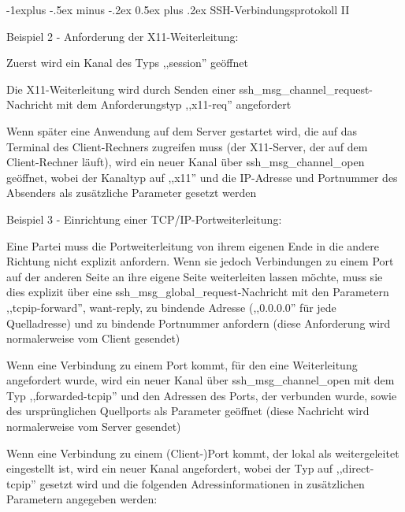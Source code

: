 \documentclass[a4paper]{article}
\makeatletter
\renewcommand{\subsection}{\@startsection{subsection}{2}{0mm}%
 {-1explus -.5ex minus -.2ex}%
 {0.5ex plus .2ex}%
 {\normalfont\normalsize\bfseries}}
\makeatother
\begin{document}
\begin{multicols}{3}
\begin{itemize*}
            \subsection{SSH-Verbindungsprotokoll
                  II}
            \begin{itemize*}
                  \item Beispiel 2 - Anforderung der X11-Weiterleitung:
                  \begin{itemize*}
                        \item Zuerst wird ein Kanal des Typs ,,session'' geöffnet
                        \item Die X11-Weiterleitung wird durch Senden einer ssh\_msg\_channel\_request-Nachricht mit dem Anforderungstyp ,,x11-req'' angefordert
                        \item Wenn später eine Anwendung auf dem Server gestartet wird, die auf das Terminal des Client-Rechners zugreifen muss (der X11-Server, der auf dem Client-Rechner läuft), wird ein neuer Kanal über ssh\_msg\_channel\_open geöffnet, wobei der Kanaltyp auf ,,x11'' und die IP-Adresse und Portnummer des Absenders als zusätzliche Parameter gesetzt werden
                  \end{itemize*}
                  \item Beispiel 3 - Einrichtung einer TCP/IP-Portweiterleitung:
                  \begin{itemize*}
                        \item Eine Partei muss die Portweiterleitung von ihrem eigenen Ende in die andere Richtung nicht explizit anfordern. Wenn sie jedoch Verbindungen zu einem Port auf der anderen Seite an ihre eigene Seite weiterleiten lassen möchte, muss sie dies explizit über eine ssh\_msg\_global\_request-Nachricht mit den Parametern ,,tcpip-forward'', want-reply, zu bindende Adresse (,,0.0.0.0'' für jede Quelladresse) und zu bindende Portnummer anfordern (diese Anforderung wird normalerweise vom Client gesendet)
                        \item Wenn eine Verbindung zu einem Port kommt, für den eine Weiterleitung angefordert wurde, wird ein neuer Kanal über ssh\_msg\_channel\_open mit dem Typ ,,forwarded-tcpip'' und den Adressen des Ports, der verbunden wurde, sowie des ursprünglichen Quellports als Parameter geöffnet (diese Nachricht wird normalerweise vom Server gesendet)
                        \item Wenn eine Verbindung zu einem (Client-)Port kommt, der lokal als weitergeleitet eingestellt ist, wird ein neuer Kanal angefordert, wobei der Typ auf ,,direct-tcpip'' gesetzt wird und die folgenden Adressinformationen in zusätzlichen Parametern angegeben werden:

\end{itemize*}
\end{itemize*}
\end{itemize*}
\end{multicols}
\end{document}

